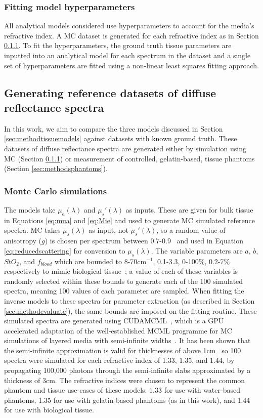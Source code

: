 \subsubsection{Fitting model hyperparameters}
All analytical models considered use hyperparameters to account for the media's refractive index. A MC dataset is generated for each refractive index as in Section \ref{sec:methodsMC}. To fit the hyperparameters, the ground truth tissue parameters are inputted into an analytical model for each spectrum in the dataset and a single set of hyperparameters are fitted using a non-linear least squares fitting approach.

\subsection{Generating reference datasets of diffuse reflectance spectra}\label{sec:methodreference}
In this work, we aim to compare the three models discussed in Section \ref{sec:methodtissuemodels} against datasets with known ground truth. These datasets of diffuse reflectance spectra are generated either by simulation using MC (Section \ref{sec:methodsMC}) or measurement of controlled, gelatin-based, tissue phantoms (Section \ref{sec:methodsphantoms}).

\subsubsection{Monte Carlo simulations}\label{sec:methodsMC}
The models take $\mu_a(\lambda)$ and $\mu_s'(\lambda)$ as inputs. These are given for bulk tissue in Equations \eqref{eq:mua} and \eqref{eq:Mie} and used to generate MC simulated reference spectra. MC takes $\mu_s(\lambda)$ as input, not $\mu_s'(\lambda)$, so a random value of anisotropy ($g$) is chosen per spectrum between 0.7-0.9~\citep{Yudovsky2009} and used in Equation \eqref{eq:reducedscattering} for conversion to $\mu_s(\lambda)$. The variable parameters are $a$, $b$, $StO_2$, and $f_{blood}$ which are bounded to 8-70cm\textrm{$^{-1}$}, 0.1-3.3, 0-100\%, 0.2-7\% respectively to mimic biological tissue~\citep{Yudovsky2009, Jacques2013}; a value of each of these variables is randomly selected within these bounds to generate each of the 100 simulated spectra, meaning 100 values of each parameter are sampled. When fitting the inverse models to these spectra for parameter extraction (as described in Section \ref{sec:methodevaluate}), the same bounds are imposed on the fitting routine. These simulated spectra are generated using CUDAMCML~\citep{Alerstam2008}, which is a GPU accelerated adaptation of the well-established MCML programme for MC simulations of layered media with semi-infinite widths~\citep{Wang1995, Prahl1989}. It has been shown that the semi-infinite approximation is valid for thicknesses of above 1cm~\citep{Zhang2014} so 100 spectra were simulated for each refractive index of 1.33, 1.35, and 1.44, by propagating 100,000 photons through the semi-infinite slabs approximated by a thickness of 3cm. The refractive indices were chosen to represent the common phantom and tissue use-cases of these models: 1.33 for use with water-based phantoms, 1.35 for use with gelatin-based phantoms (as in this work), and 1.44 for use with biological tissue.

